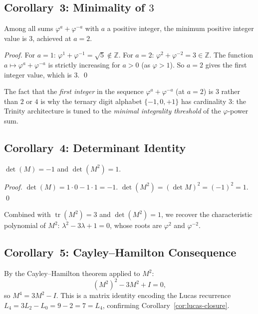 \subsection{Corollary~3: Minimality of $3$}

\begin{corollary}[Minimality of $3$]\label{cor:minimality-3}
Among all sums $\varphi^{a}+\varphi^{-a}$ with $a$ a positive
integer, the minimum positive integer value is $3$,
achieved at $a=2$.
\end{corollary}
\begin{proof}
For $a=1$: $\varphi^{1}+\varphi^{-1} = \sqrt{5} \notin \mathbb{Z}$.
For $a=2$: $\varphi^{2}+\varphi^{-2} = 3 \in \mathbb{Z}$.
The function $a \mapsto \varphi^{a}+\varphi^{-a}$ is strictly
increasing for $a > 0$ (as $\varphi > 1$).
So $a=2$ gives the first integer value, which is $3$.
\qed
\end{proof}

\begin{remark}
The fact that the \emph{first integer} in the sequence
$\varphi^{a}+\varphi^{-a}$ (at $a=2$) is $3$ rather than $2$
or $4$ is why the ternary digit alphabet $\{-1,0,+1\}$ has
cardinality $3$: the Trinity architecture is tuned to the
\emph{minimal integrality threshold} of the $\varphi$-power sum.
\end{remark}

\subsection{Corollary~4: Determinant Identity}

\begin{corollary}\label{cor:fib-det}
$\det(M) = -1$ and $\det(M^{2}) = 1$.
\end{corollary}
\begin{proof}
$\det(M) = 1 \cdot 0 - 1 \cdot 1 = -1$.
$\det(M^{2}) = (\det M)^{2} = (-1)^{2} = 1$.
\qed
\end{proof}

Combined with $\operatorname{tr}(M^{2})=3$ and $\det(M^{2})=1$, we recover
the characteristic polynomial of $M^{2}$:
$\lambda^{2} - 3\lambda + 1 = 0$, whose roots are $\varphi^{2}$
and $\varphi^{-2}$.

\subsection{Corollary~5: Cayley--Hamilton Consequence}

By the Cayley--Hamilton theorem applied to $M^{2}$:
\[
  (M^{2})^{2} - 3M^{2} + I = 0,
\]
so $M^{4} = 3M^{2} - I$.
This is a matrix identity encoding the Lucas recurrence
$L_{4} = 3L_{2} - L_{0} = 9 - 2 = 7 = L_{4}$, confirming
Corollary~\ref{cor:lucas-closure}.

